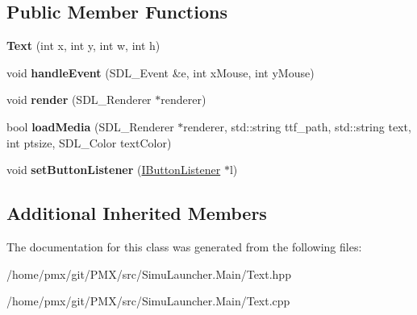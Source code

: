 \subsection*{Public Member Functions}
\begin{DoxyCompactItemize}
\item 
\mbox{\label{classText_abf32c1af5fbed8a9c4a9253b5e3c2859}} 
{\bfseries Text} (int x, int y, int w, int h)
\item 
\mbox{\label{classText_a23443342e2976ea35eff84aa0d38dba8}} 
void {\bfseries handle\+Event} (S\+D\+L\+\_\+\+Event \&e, int x\+Mouse, int y\+Mouse)
\item 
\mbox{\label{classText_a6b1fdbc3962b754e0cb2522c78be79e3}} 
void {\bfseries render} (S\+D\+L\+\_\+\+Renderer $\ast$renderer)
\item 
\mbox{\label{classText_a8901d06c01e1539619b8bbb06e018a5f}} 
bool {\bfseries load\+Media} (S\+D\+L\+\_\+\+Renderer $\ast$renderer, std\+::string ttf\+\_\+path, std\+::string text, int ptsize, S\+D\+L\+\_\+\+Color text\+Color)
\item 
\mbox{\label{classText_ae77e45244f44dd15cde6580a7085c717}} 
void {\bfseries set\+Button\+Listener} (\hyperlink{classIButtonListener}{I\+Button\+Listener} $\ast$l)
\end{DoxyCompactItemize}
\subsection*{Additional Inherited Members}


The documentation for this class was generated from the following files\+:\begin{DoxyCompactItemize}
\item 
/home/pmx/git/\+P\+M\+X/src/\+Simu\+Launcher.\+Main/Text.\+hpp\item 
/home/pmx/git/\+P\+M\+X/src/\+Simu\+Launcher.\+Main/Text.\+cpp\end{DoxyCompactItemize}
